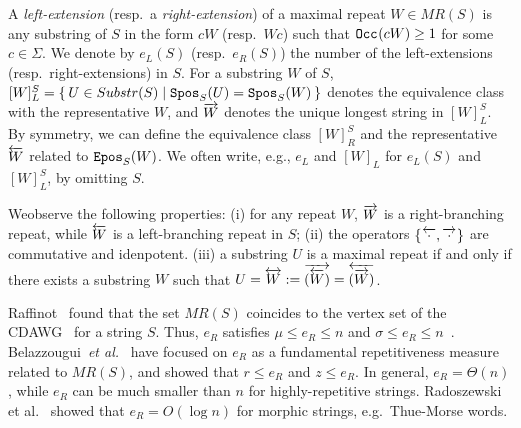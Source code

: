 A \textit{left-extension} (resp.~a \textit{right-extension}) of a maximal repeat $W \in MR(S)$ is any substring of $S$ in the form $cW$ (resp.~$Wc$) such that $\mathtt{Occ}_{}(cW)\ge 1$ for some $c \in \Sigma$. We denote by $e_L(S)$ (resp.~$e_R(S)$) the number of the left-extensions (resp.~right-extensions) in $S$. 
For a substring $W$ of $S$, $[W]^S_L = \{\kern0.2em U \in Substr(S) \mid \mathtt{Spos}_{S}(U) = \mathtt{Spos}_{S}(W) \kern0.2em\}$ denotes the equivalence class with the representative $W$, and $\overrightarrow{W}$ denotes the unique longest string in $[W]^S_L$. By symmetry, we can define the equivalence class $[W]^S_R$ and the representative $\overleftarrow{W}$  related to $\mathtt{Epos}_{S}(W)$.
We often write, e.g., $e_L$ and $[W]_L$ for $e_L(S)$ and $[W]^S_L$, by omitting $S$. 

\begin{remark}
Weobserve the following properties: 
(i) for any repeat $W$, $\overrightarrow{W}$ is a right-branching repeat, while $\overleftarrow{W}$ is a left-branching repeat in $S$;
(ii) the operators $\{\kern0.05em\overleftarrow{\cdot}, \overrightarrow{\cdot}\kern0.05em\}$ are
commutative and idenpotent.  
(iii) a substring $U$ is a maximal repeat if and only if there exists a substring $W$ such that $U = \overleftrightarrow{W} := \overrightarrow{(\overleftarrow{W})} = \overleftarrow{(\overrightarrow{W})}$.
\end{remark}

Raffinot~\cite{raffinot2001maximal} found that the set $MR(S)$ coincides to the vertex set of the CDAWG~\cite{blumer1987complete} for a string $S$. 
Thus, $e_R$ satisfies $\mu \le e_R \le n$ and $\sigma \le e_R \le n$~\cite{blumer1987complete,raffinot2001maximal}. 
Belazzougui~\textit{et al.}~\cite{belazzougui:cunial:gagie:prezza:raffinot2015composite} have focused on $e_R$ as a fundamental repetitiveness measure related to $MR(S)$, and showed that $r \le e_R$ and $z \le e_R$. In general, $e_R = \Theta(n)$, while $e_R$ can be much smaller than $n$ for highly-repetitive strings. Radoszewski et al.~\cite{radoszewski:rytter2012structure:cdawg:thuemorse} showed that $e_R = O(\log n)$ for morphic strings, e.g.~Thue-Morse words.
